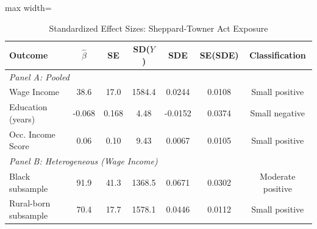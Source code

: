 \begin{table}[htbp]
\centering
\caption{Standardized Effect Sizes: Sheppard-Towner Act Exposure}
\label{tab:sde}
\begin{threeparttable}
\begin{adjustbox}{max width=\textwidth}
\begin{tabular}{lcccccc}
\toprule
Outcome & $\hat{\beta}$ & SE & SD($Y$) & SDE & SE(SDE) & Classification \\
\midrule
\multicolumn{7}{l}{\textit{Panel A: Pooled}} \\
Wage Income & 38.6 & 17.0 & 1584.4 & 0.0244 & 0.0108 & Small positive \\
Education (years) & -0.068 & 0.168 & 4.48 & -0.0152 & 0.0374 & Small negative \\
Occ. Income Score & 0.06 & 0.10 & 9.43 & 0.0067 & 0.0105 & Small positive \\
\midrule
\multicolumn{7}{l}{\textit{Panel B: Heterogeneous (Wage Income)}} \\
Black subsample & 91.9 & 41.3 & 1368.5 & 0.0671 & 0.0302 & Moderate positive \\
Rural-born subsample & 70.4 & 17.7 & 1578.1 & 0.0446 & 0.0112 & Small positive \\
\bottomrule
\end{tabular}
\end{adjustbox}
\begin{tablenotes}[flushleft]\footnotesize

\end{tablenotes}
\end{threeparttable}
\end{table}
